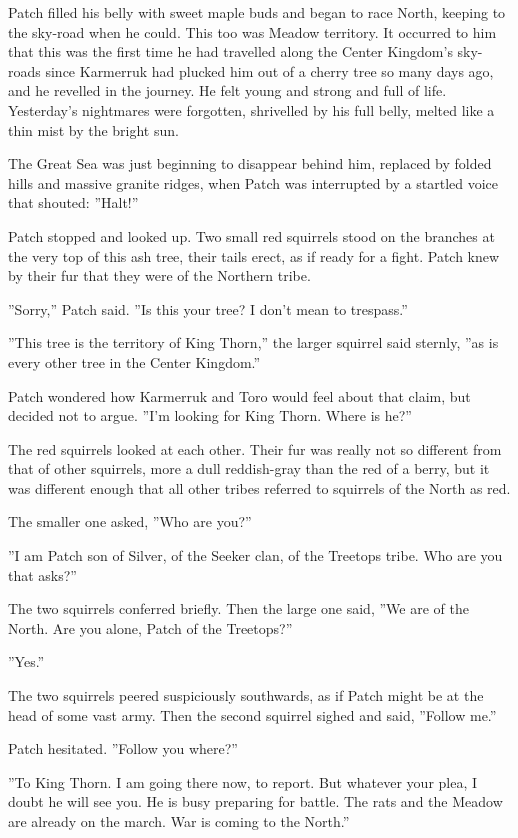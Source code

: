 \documentclass[12pt]{book}
\begin{document}
Patch filled his belly with sweet maple buds and began to race North,
keeping to the sky-road when he could. This too was Meadow
territory. It occurred to him that this was the first time he had
travelled along the Center Kingdom's sky-roads since Karmerruk had
plucked him out of a cherry tree so many days ago, and he revelled in
the journey. He felt young and strong and full of life. Yesterday's
nightmares were forgotten, shrivelled by his full belly, melted like a
thin mist by the bright sun.

The Great Sea was just beginning to disappear behind him, replaced by
folded hills and massive granite ridges, when Patch was interrupted by
a startled voice that shouted: ''Halt!''

Patch stopped and looked up. Two small red squirrels stood on the
branches at the very top of this ash tree, their tails erect, as if
ready for a fight. Patch knew by their fur that they were of the
Northern tribe.

''Sorry,'' Patch said. ''Is this your tree? I don't mean to
trespass.''

''This tree is the territory of King Thorn,'' the larger squirrel said
sternly, ''as is every other tree in the Center Kingdom.''

Patch wondered how Karmerruk and Toro would feel about that claim, but
decided not to argue. ''I'm looking for King Thorn. Where is he?''

The red squirrels looked at each other. Their fur was really not so
different from that of other squirrels, more a dull reddish-gray than
the red of a berry, but it was different enough that all other tribes
referred to squirrels of the North as red.

The smaller one asked, ''Who are you?''

''I am Patch son of Silver, of the Seeker clan, of the Treetops
tribe. Who are you that asks?''

The two squirrels conferred briefly. Then the large one said, ''We are
of the North. Are you alone, Patch of the Treetops?''

''Yes.''

The two squirrels peered suspiciously southwards, as if Patch might be
at the head of some vast army. Then the second squirrel sighed and
said, ''Follow me.''

Patch hesitated. ''Follow you where?''

''To King Thorn. I am going there now, to report. But whatever your
plea, I doubt he will see you. He is busy preparing for battle. The
rats and the Meadow are already on the march. War is coming to the
North.''
\end{document}
